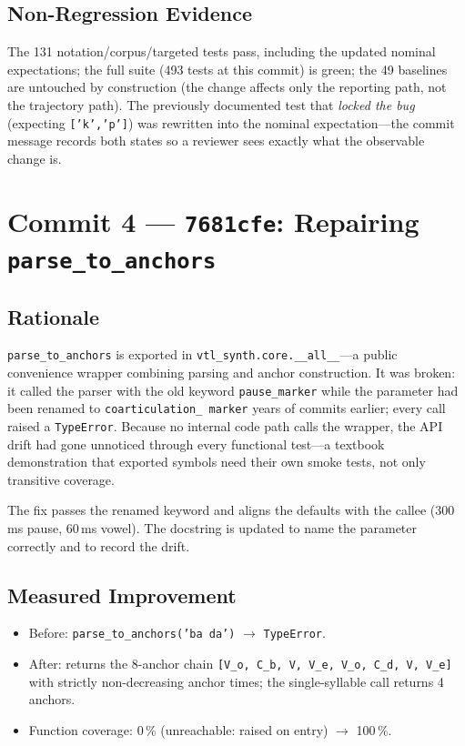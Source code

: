 \documentclass[11pt,a4paper]{article}
\newcommand{\code}[1]{\texttt{#1}}
\newcommand{\commit}[1]{\texttt{#1}}
\newcommand{\pct}[1]{{#1}\,\%}
\begin{document}
\subsection{Non-Regression Evidence}

The 131 notation/corpus/targeted tests pass, including the updated
nominal expectations; the full suite (493 tests at this commit) is
green; the 49 baselines are untouched by construction (the change
affects only the reporting path, not the trajectory path). The
previously documented test that \emph{locked the bug} (expecting
\code{['k','p']}) was rewritten into the nominal expectation---the
commit message records both states so a reviewer sees exactly what
the observable change is.

\section{Commit 4 --- \commit{7681cfe}: Repairing \code{parse\_to\_anchors}}
\label{sec:c4}

\subsection{Rationale}

\code{parse\_to\_anchors} is exported in
\code{vtl\_synth.core.\_\_all\_\_}---a public convenience wrapper
combining parsing and anchor construction. It was broken: it
called the parser with the old keyword \code{pause\_marker}
while the parameter had been renamed to \code{coarticulation\_
marker} years of commits earlier; every call raised a
\code{TypeError}. Because no internal code path calls the wrapper,
the API drift had gone unnoticed through every functional test---a
textbook demonstration that exported symbols need their own smoke
tests, not only transitive coverage.

The fix passes the renamed keyword and aligns the defaults with the
callee (300\,ms pause, 60\,ms vowel). The docstring is updated to
name the parameter correctly and to record the drift.

\subsection{Measured Improvement}

\begin{itemize}[leftmargin=1.4em, itemsep=0.15em]
  \item Before: \code{parse\_to\_anchors('ba da')} $\to$
        \code{TypeError}.
  \item After: returns the 8-anchor chain
        \code{[V\_o, C\_b, V, V\_e, V\_o, C\_d, V, V\_e]} with
        strictly non-decreasing anchor times; the single-syllable
        call returns 4 anchors.
  \item Function coverage: \pct{0} (unreachable: raised on entry)
        $\to$ \pct{100}.
\end{itemize}
\end{document}
